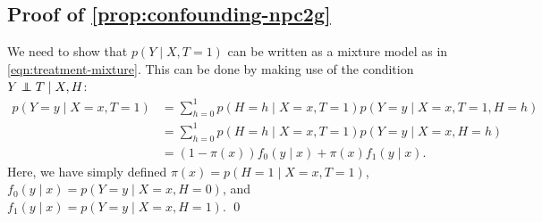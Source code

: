 \subsection{Proof of \cref{prop:confounding-npc2g}}

We need to show that $p(Y \mid X, T=1)$ can be written as a mixture model as in \cref{eqn:treatment-mixture}. This can be done by making use of the condition $Y \perp\!\!\!\!\perp T \mid X, H$:
\begin{align*}
p(Y = y \mid X=x, T=1) &= \sum_{h=0}^1 p(H=h \mid X=x, T=1) p(Y = y \mid X=x, T=1, H=h) \\
&= \sum_{h=0}^1 p(H=h \mid X=x, T=1) p(Y = y \mid X=x, H=h) \\
&= (1-\pi(x)) f_0(y \mid x) + \pi(x) f_1(y \mid x).
\end{align*}
Here, we have simply defined $\pi(x) = p(H=1 \mid X=x, T=1)$, $f_0(y \mid x) = p(Y = y \mid X=x, H=0)$, and $f_1(y \mid x) = p(Y = y \mid X=x, H=1)$. \qed